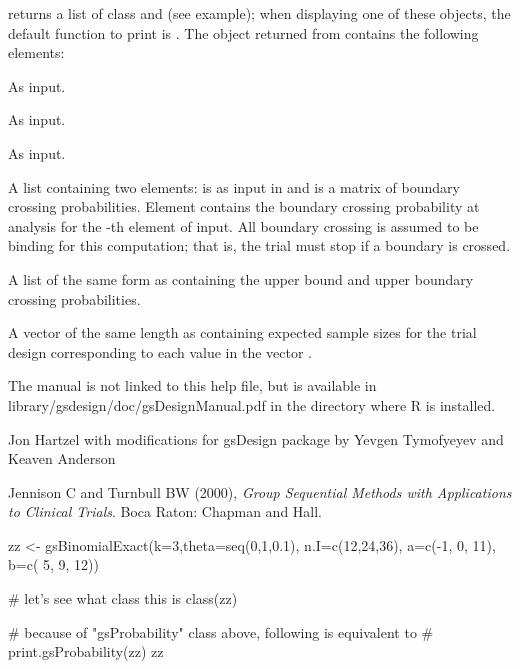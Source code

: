 \begin{Value}
 returns a list of class  and  (see example); when displaying one of these objects, the default function to print is . 
The object returned from  contains the following elements: 
\begin{ldescription}
\item[\code{k}] As input.
\item[\code{theta}] As input.
\item[\code{n.I}] As input.
\item[\code{lower}] A list containing two elements:  is as input in  and  is a matrix of boundary 
crossing probabilities. Element  contains the boundary crossing probability at analysis  for the -th element of  input. All boundary crossing is assumed to be binding for this computation; that is, the trial must stop if a boundary is crossed.
\item[\code{upper}] A list of the same form as  containing the upper bound and upper boundary crossing probabilities.
\item[\code{en}] A vector of the same length as  containing expected sample sizes for the trial design
corresponding to each value in the vector .
\end{ldescription}
\end{Value}
\begin{Note}\relax
The manual is not linked to this help file, but is available in library/gsdesign/doc/gsDesignManual.pdf
in the directory where R is installed.
\end{Note}
\begin{Author}\relax
Jon Hartzel with modifications for gsDesign package by Yevgen Tymofyeyev and Keaven Anderson 
\end{Author}
\begin{References}\relax
Jennison C and Turnbull BW (2000), \emph{Group Sequential Methods with Applications to Clinical Trials}.
Boca Raton: Chapman and Hall.
\end{References}
\begin{SeeAlso}\relax
{}
\end{SeeAlso}
\begin{Examples}
\begin{ExampleCode}

zz <- gsBinomialExact(k=3,theta=seq(0,1,0.1), n.I=c(12,24,36),
        a=c(-1, 0, 11),  b=c( 5, 9, 12))

# let's see what class this is
class(zz)

# because of "gsProbability" class above, following is equivalent to 
# print.gsProbability(zz)
zz
\end{ExampleCode}
\end{Examples}

